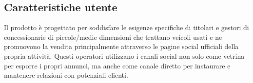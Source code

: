 
\subsection{Caratteristiche utente}
Il prodotto è progettato per soddisfare le esigenze specifiche di titolari e gestori di concessionarie di piccole/medie dimensioni che trattano veicoli usati e ne promuovono la vendita principalmente attraverso le pagine social ufficiali della propria attività. 
Questi operatori utilizzano i canali social non solo come vetrina per esporre i propri annunci, ma anche come canale diretto per instaurare e mantenere relazioni con potenziali clienti.